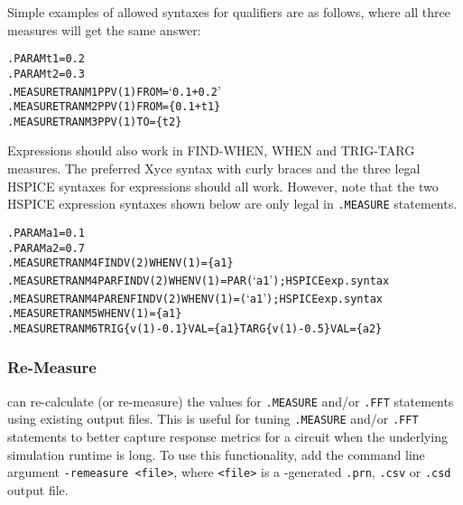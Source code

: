 Simple examples of allowed syntaxes for qualifiers are as follows, where
all three measures will get the same answer:
\begin{alltt}
.PARAM t1=0.2
.PARAM t2=0.3
.MEASURE TRAN M1 PP V(1) FROM=`0.1+0.2'
.MEASURE TRAN M2 PP V(1) FROM=\{0.1+t1\}
.MEASURE TRAN M3 PP V(1) TO=\{t2\}
\end{alltt}
Expressions should also work in FIND-WHEN, WHEN and TRIG-TARG measures. The
preferred Xyce syntax with curly braces and the three legal HSPICE syntaxes
for expressions should all work.  However, note that the two HSPICE
expression syntaxes shown below are only legal in \Xyce{} \texttt{.MEASURE}
statements.
\begin{alltt}
.PARAM a1=0.1
.PARAM a2=0.7
.MEASURE TRAN M4 FIND V(2) WHEN V(1)=\{a1\}
.MEASURE TRAN M4PAR FIND V(2) WHEN V(1)=PAR(`a1') ; HSPICE exp. syntax
.MEASURE TRAN M4PAREN FIND V(2) WHEN V(1)=(`a1')  ; HSPICE exp. syntax
.MEASURE TRAN M5 WHEN V(1)=\{a1\}
.MEASURE TRAN M6 TRIG \{v(1)-0.1\} VAL=\{a1\} TARG \{v(1)-0.5\} VAL=\{a2\}
\end{alltt}

\subsubsection{Re-Measure}
\label{Measure_ReMeasure}
\Xyce{} can re-calculate (or re-measure) the values for {\tt .MEASURE} and/or
{\tt .FFT} statements using existing \Xyce{} output files.  This is useful for
tuning {\tt .MEASURE} and/or {\tt .FFT} statements to better capture response
metrics for a circuit when the underlying simulation runtime is long.  To use this
functionality, add the command line argument {\tt -remeasure <file>},
where {\tt <file>} is a \Xyce{}-generated {\tt .prn}, {\tt .csv} or
{\tt .csd} output file.

